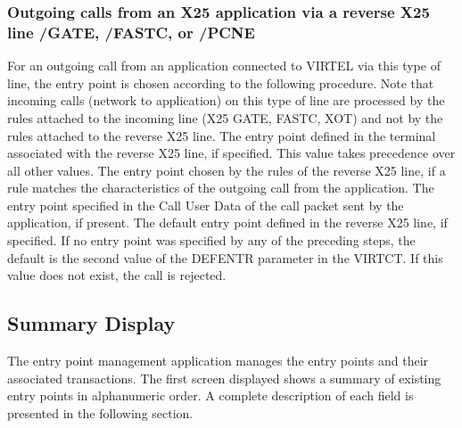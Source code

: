 \documentclass[letterpaper,10pt,english]{sphinxmanual}
\begin{document}
\subsubsection{Outgoing calls from an X25 application via a reverse X25 line \sphinxhyphen{} /GATE, /FASTC, or /PCNE}
\label{\detokenize{connectivity_guide:outgoing-calls-from-an-x25-application-via-a-reverse-x25-line-gate-fastc-or-pcne}}
\sphinxAtStartPar
For an outgoing call from an application connected to VIRTEL via this type of line, the entry point is chosen according
to the following procedure. Note that incoming calls (network to application) on this type of line are processed by the
rules attached to the incoming line (X25 GATE, FASTC, XOT) and not by the rules attached to the reverse X25 line.
\sphinxhyphen{} The entry point defined in the terminal associated with the reverse X25 line, if specified. This value takes precedence over all other values.
\sphinxhyphen{} The entry point chosen by the rules of the reverse X25 line, if a rule matches the characteristics of the outgoing call from the application.
\sphinxhyphen{} The entry point specified in the Call User Data of the call packet sent by the application, if present.
\sphinxhyphen{} The default entry point defined in the reverse X25 line, if specified.
\sphinxhyphen{} If no entry point was specified by any of the preceding steps, the default is the second value of the DEFENTR parameter in the VIRTCT. If this value does not exist, the call is rejected.

\ignorespaces 

\subsection{Summary Display}
\label{\detokenize{connectivity_guide:index-106}}\label{\detokenize{connectivity_guide:id57}}
\sphinxAtStartPar
The entry point management application manages the entry points and their associated transactions. The first screen displayed shows a summary of existing entry points in alphanumeric order. A complete description of each field is presented in the following section.

\sphinxAtStartPar
{}
\end{document}
